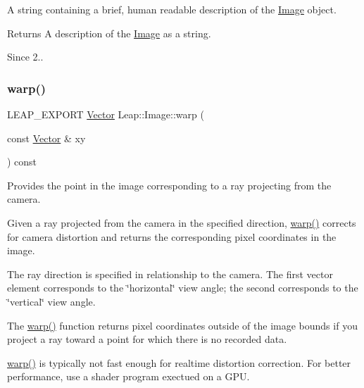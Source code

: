 A string containing a brief, human readable description of the \hyperlink{class_leap_1_1_image}{Image} object.

\begin{DoxyReturn}{Returns}
A description of the \hyperlink{class_leap_1_1_image}{Image} as a string. 
\end{DoxyReturn}
\begin{DoxySince}{Since}
2.. 
\end{DoxySince}
\mbox{\label{class_leap_1_1_image_a8bb3e9747ecaba23b2a47043d823ee24}} 
\subsubsection{\texorpdfstring{warp()}{warp()}}
{\footnotesize\ttfamily L\+E\+A\+P\+\_\+\+E\+X\+P\+O\+RT \hyperlink{struct_leap_1_1_vector}{Vector} Leap\+::\+Image\+::warp (\begin{DoxyParamCaption}\item[{const \hyperlink{struct_leap_1_1_vector}{Vector} \&}]{xy }\end{DoxyParamCaption}) const}

Provides the point in the image corresponding to a ray projecting from the camera.

Given a ray projected from the camera in the specified direction, {\ttfamily \hyperlink{class_leap_1_1_image_a8bb3e9747ecaba23b2a47043d823ee24}{warp()}} corrects for camera distortion and returns the corresponding pixel coordinates in the image.

The ray direction is specified in relationship to the camera. The first vector element corresponds to the \char`\"{}horizontal\char`\"{} view angle; the second corresponds to the \char`\"{}vertical\char`\"{} view angle.


\begin{DoxyCodeInclude}
\end{DoxyCodeInclude}


The {\ttfamily \hyperlink{class_leap_1_1_image_a8bb3e9747ecaba23b2a47043d823ee24}{warp()}} function returns pixel coordinates outside of the image bounds if you project a ray toward a point for which there is no recorded data.

{\ttfamily \hyperlink{class_leap_1_1_image_a8bb3e9747ecaba23b2a47043d823ee24}{warp()}} is typically not fast enough for realtime distortion correction. For better performance, use a shader program exectued on a G\+PU.



